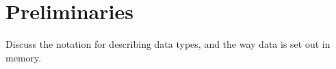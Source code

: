 \chapter{Preliminaries}
Discuss the notation for describing data types, and the way data is set out in memory.
